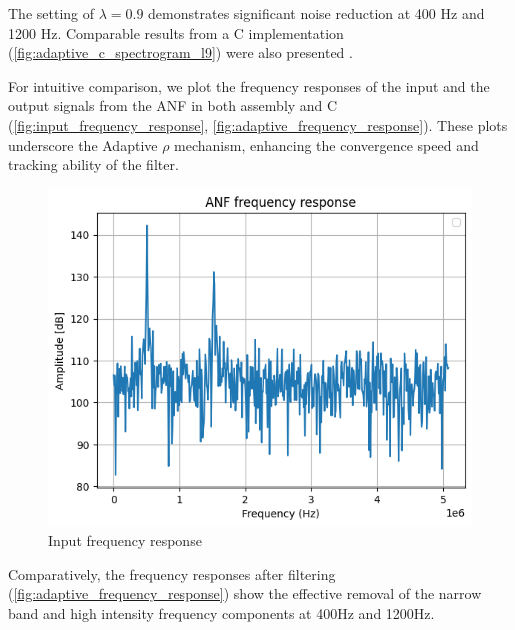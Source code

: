 The setting of $\lambda = 0.9$  demonstrates significant noise reduction at 400 Hz and 1200 Hz. Comparable results from a C implementation (\autoref{fig:adaptive_c_spectrogram_l9}) were also presented .


For intuitive comparison, we plot the frequency responses of the input and the output signals from the ANF in both assembly and C (\autoref{fig:input_frequency_response}, \autoref{fig:adaptive_frequency_response}). These plots underscore the Adaptive $\rho$ mechanism, enhancing the convergence speed and tracking ability of the filter.

\begin{figure}[ht]
\centering
\includegraphics[width=0.5\columnwidth]{images/input_frequency_response.png}
\caption{Input frequency response}
\label{fig:input_frequency_response}
\end{figure}

Comparatively, the frequency responses after filtering (\autoref{fig:adaptive_frequency_response}) show the effective removal of the narrow band and high intensity frequency components at 400Hz and 1200Hz.

